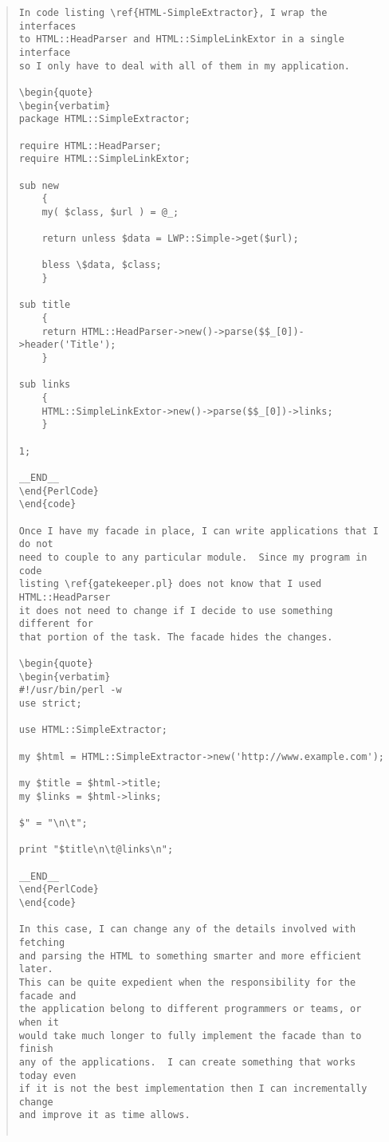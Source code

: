 \begin{quote}
\begin{verbatim}
In code listing \ref{HTML-SimpleExtractor}, I wrap the interfaces
to HTML::HeadParser and HTML::SimpleLinkExtor in a single interface
so I only have to deal with all of them in my application.

\begin{quote}
\begin{verbatim}
package HTML::SimpleExtractor;

require HTML::HeadParser;
require HTML::SimpleLinkExtor;

sub new
	{
	my( $class, $url ) = @_;
	
	return unless $data = LWP::Simple->get($url);
	
	bless \$data, $class;
	}
	
sub title
	{
	return HTML::HeadParser->new()->parse($$_[0])->header('Title');
	}
	
sub links
	{
	HTML::SimpleLinkExtor->new()->parse($$_[0])->links;
	}

1;

__END__		
\end{PerlCode}
\end{code}

Once I have my facade in place, I can write applications that I do not
need to couple to any particular module.  Since my program in code
listing \ref{gatekeeper.pl} does not know that I used HTML::HeadParser
it does not need to change if I decide to use something different for
that portion of the task. The facade hides the changes.

\begin{quote}
\begin{verbatim}
#!/usr/bin/perl -w
use strict;

use HTML::SimpleExtractor;

my $html = HTML::SimpleExtractor->new('http://www.example.com');

my $title = $html->title;
my $links = $html->links;

$" = "\n\t";

print "$title\n\t@links\n";

__END__
\end{PerlCode}
\end{code}
 
In this case, I can change any of the details involved with fetching
and parsing the HTML to something smarter and more efficient later.
This can be quite expedient when the responsibility for the facade and
the application belong to different programmers or teams, or when it
would take much longer to fully implement the facade than to finish
any of the applications.  I can create something that works today even
if it is not the best implementation then I can incrementally change
and improve it as time allows.


\end{verbatim}
\end{quote}
